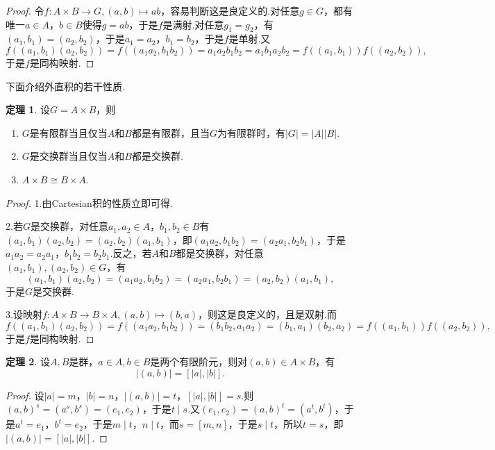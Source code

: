 \documentclass[12pt]{ctexart}
\theoremstyle{definition}
\newtheorem{theorem}{定理}[section]
\theoremstyle{plain}
\begin{document}
\begin{proof}
	令$f:A\times B\to G,(a,b)\mapsto ab$，容易判断这是良定义的.对任意$g\in G$，都有唯一$a\in A$，$b\in B$使得$g=ab$，于是$f$是满射.对任意$g_1=g_2$，有$(a_1,b_1)=(a_2,b_2)$，于是$a_1=a_2$，$b_1=b_2$，于是$f$是单射.又
	$$f\left((a_1,b_1)(a_2,b_2)\right)=f\left((a_1a_2,b_1b_2)\right)=a_1a_2b_1b_2=a_1b_1a_2b_2=f\left((a_1,b_1)\right)f\left((a_2,b_2)\right),$$
	于是$f$是同构映射.
\end{proof}
下面介绍外直积的若干性质.
\begin{theorem}
	设$G=A\times B$，则
	\begin{enumerate}
		\item $G$是有限群当且仅当$A$和$B$都是有限群，且当$G$为有限群时，有$|G|=|A||B|$.
		\item $G$是交换群当且仅当$A$和$B$都是交换群.
		\item $A\times B\cong B\times A$.
	\end{enumerate}
\end{theorem}
\begin{proof}
	1.由Cartesian积的性质立即可得.
	
	2.若$G$是交换群，对任意$a_1,a_2\in A$，$b_1,b_2\in B$有$(a_1,b_1)(a_2,b_2)=(a_2,b_2)(a_1,b_1)$，即$(a_1a_2,b_1b_2)=(a_2a_1,b_2b_1)$，于是$a_1a_2=a_2a_1$，$b_1b_2=b_2b_1$.反之，若$A$和$B$都是交换群，对任意$(a_1,b_1),(a_2,b_2)\in G$，有
	$$(a_1,b_1)(a_2,b_2)=(a_1a_2,b_1b_2)=(a_2a_1,b_2b_1)=(a_2,b_2)(a_1,b_1),$$
	于是$G$是交换群.
	
	3.设映射$f:A\times B\to B\times A,(a,b)\mapsto(b,a)$，则这是良定义的，且是双射.而
	$$f\left((a_1,b_1)(a_2,b_2)\right)=f\left((a_1a_2,b_1b_2)\right)=(b_1b_2,a_1a_2)=(b_1,a_1)(b_2,a_2)=f\left((a_1,b_1)\right)f\left((a_2,b_2)\right),$$
	于是$f$是同构映射.
\end{proof}
\begin{theorem}
	设$A,B$是群，$a\in A,b\in B$是两个有限阶元，则对$(a,b)\in A\times B$，有
	$$|(a,b)|=\left[|a|,|b|\right].$$
\end{theorem}
\begin{proof}
	设$|a|=m$，$|b|=n$，$|(a,b)|=t$，$\left[|a|,|b|\right]=s$.则$(a,b)^s=(a^s,b^s)=(e_1,e_2)$，于是$t\mid s$.又$(e_1,e_2)=(a,b)^t=(a^t,b^t)$，于是$a^t=e_1$，$b^t=e_2$，于是$m\mid t$，$n\mid t$，而$s=\left[m,n\right]$，于是$s\mid t$，所以$t=s$，即$|(a,b)|=\left[|a|,|b|\right]$.
\end{proof}
\end{document}
